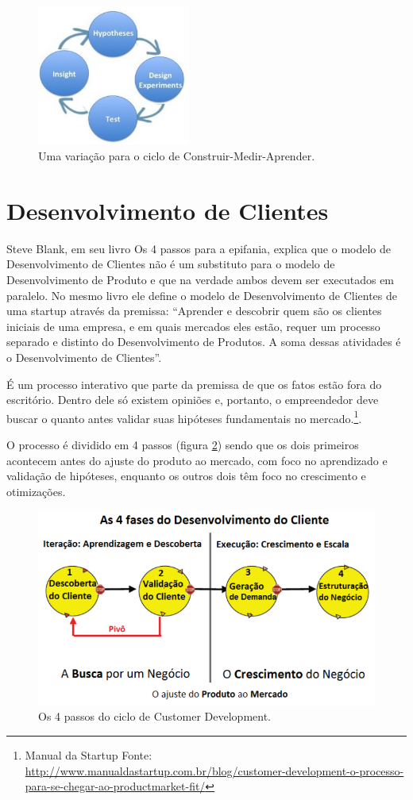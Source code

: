\begin{figure}[htb]
\centering
\includegraphics[width=5cm]{figuras/hypotheses-experiment}
\caption{\label{fig:hypotheses-experiment} Uma variação para o ciclo de Construir-Medir-Aprender.}
\end{figure}

\section{Desenvolvimento de Clientes}
\par Steve Blank, em seu livro Os 4 passos para a epifania, explica que o modelo de Desenvolvimento de Clientes não é um substituto para o modelo de Desenvolvimento de Produto e que na verdade ambos devem ser executados em paralelo. No mesmo livro ele define o modelo de Desenvolvimento de Clientes de uma startup através da premissa: “Aprender e descobrir quem são os clientes iniciais de uma empresa, e em quais mercados eles estão, requer um processo separado e distinto do Desenvolvimento de Produtos. A soma dessas atividades é o Desenvolvimento de Clientes”. \citep{blank:03}
\par É um processo interativo que parte da premissa de que os fatos estão fora do escritório. Dentro dele só existem opiniões e, portanto, o empreendedor deve buscar o quanto antes validar suas hipóteses fundamentais no mercado.\footnote{Manual da Startup Fonte: \url{http://www.manualdastartup.com.br/blog/customer-development-o-processo-para-se-chegar-ao-productmarket-fit/}}.
\par O processo é dividido em 4 passos (figura \ref{fig:customerdevelopment}) sendo que os dois primeiros acontecem antes do ajuste do produto ao mercado, com foco no aprendizado e validação de hipóteses, enquanto os outros dois têm foco no crescimento e otimizações.
\begin{figure}[htb]
\centering
\includegraphics[width=15cm]{figuras/customerdevelopment}
\caption{\label{fig:customerdevelopment}Os 4 passos do ciclo de Customer Development.}
\end{figure}
